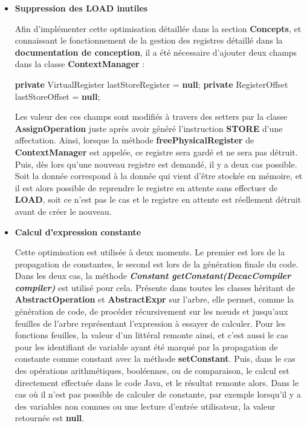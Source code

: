 \documentclass[
]{article}
\newenvironment{Shaded}{}{}
\newcommand{\KeywordTok}[1]{\textcolor[rgb]{0.00,0.44,0.13}{\textbf{#1}}}
\newcommand{\NormalTok}[1]{#1}
\newcommand{\OperatorTok}[1]{\textcolor[rgb]{0.40,0.40,0.40}{#1}}
\begin{document}
\begin{itemize}
\item
  \textbf{Suppression des LOAD inutiles}

  Afin d'implémenter cette optimisation détaillée dans la section
  \textbf{Concepts}, et connaissant le fonctionnement de la gestion des
  registres détaillé dans la \textbf{documentation de conception}, il a
  été nécessaire d'ajouter deux champs dans la classe
  \textbf{ContextManager} :

\begin{Shaded}
\begin{Highlighting}[]
\KeywordTok{private}\NormalTok{ VirtualRegister lastStoreRegister }\OperatorTok{=} \KeywordTok{null}\OperatorTok{;}
\KeywordTok{private}\NormalTok{ RegisterOffset lastStoreOffset }\OperatorTok{=} \KeywordTok{null}\OperatorTok{;}
\end{Highlighting}
\end{Shaded}

  Les valeur des ces champs sont modifiés à travers des setters par la
  classe \textbf{AssignOperation} juste après avoir généré l'instruction
  \textbf{STORE} d'une affectation. Ainsi, lorsque la méthode
  \textbf{freePhysicalRegister} de \textbf{ContextManager} est appelée,
  ce registre sera gardé et ne sera pas détruit. Puis, dès lors qu'une
  nouveau registre est demandé, il y a deux cas possible. Soit la donnée
  correspond à la donnée qui vient d'être stockée en mémoire, et il est
  alors possible de reprendre le registre en attente sans effectuer de
  \textbf{LOAD}, soit ce n'est pas le cas et le registre en attente est
  réellement détruit avant de créer le nouveau.
\item
  \textbf{Calcul d'expression constante}

  Cette optimisation est utilisée à deux moments. Le premier est lors de
  la propagation de constantes, le second est lors de la génération
  finale du code. Dans les deux cas, la méthode \emph{\textbf{Constant
  getConstant(DecacCompiler compiler)}} est utilisé pour cela. Présente
  dans toutes les classes héritant de \textbf{AbstractOperation} et
  \textbf{AbstractExpr} sur l'arbre, elle permet, comme la génération de
  code, de procéder récursivement sur les nœuds et jusqu'aux feuilles de
  l'arbre représentant l'expression à essayer de calculer. Pour les
  fonctions feuilles, la valeur d'un littéral remonte ainsi, et c'est
  aussi le cas pour les identifiant de variable ayant été marqué par la
  propagation de constante comme constant avec la méthode
  \textbf{setConstant}. Puis, dans le cas des opérations arithmétiques,
  booléennes, ou de comparaison, le calcul est directement effectuée
  dans le code Java, et le résultat remonte alors. Dans le cas où il
  n'est pas possible de calculer de constante, par exemple lorsqu'il y a
  des variables non connues ou une lecture d'entrée utilisateur, la
  valeur retournée est \textbf{null}.


\end{itemize}
\end{document}
